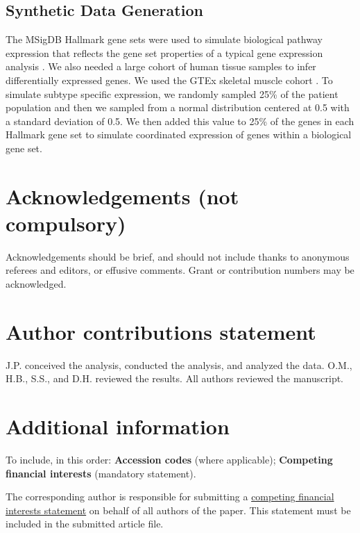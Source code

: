 \documentclass[fleqn,10pt]{wlscirep}
\begin{document}
\subsection{Synthetic Data Generation}
The MSigDB Hallmark gene sets were used to simulate biological pathway expression that reflects the gene set properties of a typical gene expression analysis \cite{liberzon2015molecular,liberzon2011molecular}. We also needed a large cohort of human tissue samples to infer differentially expressed genes. We used the GTEx skeletal muscle cohort \cite{consortium2013genotype}. To simulate subtype specific expression, we randomly sampled 25\% of the patient population and then we sampled from a normal distribution centered at 0.5 with a standard deviation of 0.5. We then added this value to 25\% of the genes in each Hallmark gene set to simulate coordinated expression of genes within a biological gene set.






\section*{Acknowledgements (not compulsory)}

Acknowledgements should be brief, and should not include thanks to anonymous referees and editors, or effusive comments. Grant or contribution numbers may be acknowledged.

\section*{Author contributions statement}

J.P. conceived the analysis, conducted the analysis, and analyzed the data. O.M., H.B., S.S., and D.H. reviewed the results.  All authors reviewed the manuscript. 

\section*{Additional information}

To include, in this order: \textbf{Accession codes} (where applicable); \textbf{Competing financial interests} (mandatory statement). 

The corresponding author is responsible for submitting a \href{http://www.nature.com/srep/policies/index.html#competing}{competing financial interests statement} on behalf of all authors of the paper. This statement must be included in the submitted article file.
\end{document}
